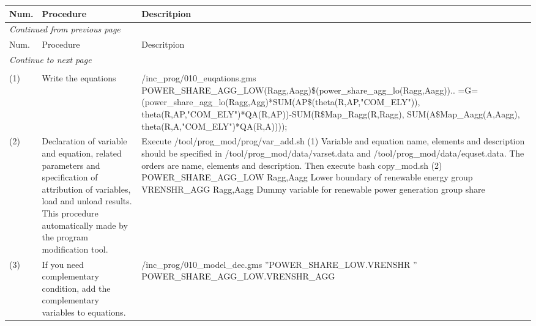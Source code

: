 \documentclass[10pt,a4paper,titlepage,dvipdfmx]{book}
\begin{document}
\begin{landscape}
\begin{tabularx}{\textwidth}{|
p{}|
p{}|
p{}|} 
\caption{\label{tab:ProAddNewEqu}Procedures to add new equations and variables} \\
 \hline
Num. & Procedure & Descritpion \\\hline 
 \endfirsthead
 \multicolumn{3}{l}{\small\it Continued from previous page}\\
 \hline
Num. & Procedure & Descritpion \\ 
 \endhead
 \hline
 \multicolumn{3}{l}{\small\it Continue to next page}\\
 \endfoot
 \hline
 \multicolumn{3}{l}{\small\it End}\\
 \endlastfoot
\hline 
(1) & Write the equations  & /inc\_prog/010\_euqations.gms \newline POWER\_SHARE\_AGG\_LOW(Ragg,Aagg)\$(power\_share\_agg\_lo(Ragg,Aagg)).. \newline
0 =G= (power\_share\_agg\_lo(Ragg,Agg)*SUM(AP\$(theta(R,AP,"COM\_ELY")), \newline theta(R,AP,"COM\_ELY")*QA(R,AP))-SUM(R\$Map\_Ragg(R,Ragg), SUM(A\$Map\_Aagg(A,Aagg), theta(R,A,"COM\_ELY")*QA(R,A))));  \\\hline 
(2) & Declaration of variable and equation, related parameters and specification of attribution of variables, load and unload results. \newline This procedure automatically made by the program modification tool. & Execute /tool/prog\_mod/prog/var\_add.sh (1) \newline Variable and equation name, elements and description should be specified in /tool/prog\_mod/data/varset.data and /tool/prog\_mod/data/equset.data. The orders are name, elements and description.  \newline Then execute bash copy\_mod.sh (2) \newline POWER\_SHARE\_AGG\_LOW Ragg,Aagg Lower boundary of renewable energy group \newline VRENSHR\_AGG Ragg,Aagg Dummy variable for renewable power generation group share \\\hline 
(3) & If you need complementary condition, add the complementary variables to equations. & /inc\_prog/010\_model\_dec.gms \newline ''POWER\_SHARE\_LOW.VRENSHR   '' \newline POWER\_SHARE\_AGG\_LOW.VRENSHR\_AGG \\\hline 

\end{tabularx}
\end{landscape}
\end{document}
